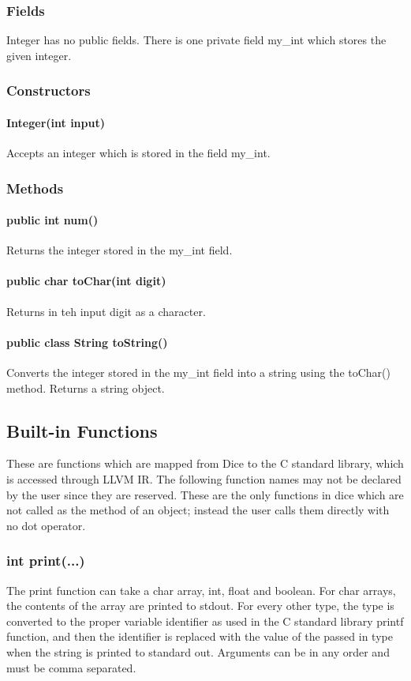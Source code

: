 \begin{homeworkProblem}
	\subsubsection{Fields}
	Integer has no public fields. There is one private field my\_int which stores the given integer.
	
	\subsubsection{Constructors}
	\paragraph{Integer(int input)}
	Accepts an integer which is stored in the field my\_int.
	
	\subsubsection{Methods}
	\paragraph{public int num()}
	Returns the integer stored in the my\_int field.
	\paragraph{public char toChar(int digit)}
	Returns in teh input digit as a character.
	\paragraph{public class String toString()}
	Converts the integer stored in the my\_int field into a string using the toChar() method. Returns a string object.
	\subsection{Built-in Functions}
	These are functions which are mapped from Dice to the C standard library, which is accessed through LLVM IR. The following function names may not be declared by the user since they are reserved. These are the only functions in dice which are not called as the method of an object; instead the user calls them directly with no dot operator.
	\subsubsection{int print(...)}
	The print function can take a char array, int, float and boolean. For char arrays, the contents of the array are printed to stdout. For every other type, the type is converted to the proper variable identifier as used in the C standard library printf function, and then the identifier is replaced with the value of the passed in type when the string is printed to standard out. Arguments can be in any order and must be comma separated.

\end{homeworkProblem}
